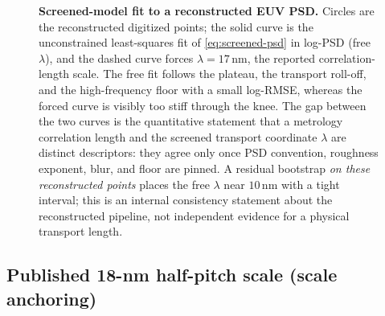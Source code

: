 \documentclass[11pt]{article}
\begin{document}
\begin{figure}[htbp]
\centering
\def\lamfree{10.11}\def\rmsefree{0.111}\def\rmseforced{0.350}
\centering
{}

\caption{\textbf{Screened-model fit to a reconstructed EUV PSD.} Circles are the reconstructed digitized points; the solid curve is the unconstrained least-squares fit of \eqref{eq:screened-psd} in log-PSD (free \(\lambda\)), and the dashed curve forces \(\lambda=17\,\mathrm{nm}\), the reported correlation-length scale. The free fit follows the plateau, the transport roll-off, and the high-frequency floor with a small log-RMSE, whereas the forced curve is visibly too stiff through the knee. The gap between the two curves is the quantitative statement that a metrology correlation length and the screened transport coordinate \(\lambda\) are distinct descriptors: they agree only once PSD convention, roughness exponent, blur, and floor are pinned. A residual bootstrap \emph{on these reconstructed points} places the free \(\lambda\) near \(10\,\mathrm{nm}\) with a tight interval; this is an internal consistency statement about the reconstructed pipeline, not independent evidence for a physical transport length.}
\label{fig:measured-psd-fit}
\end{figure}

\subsection{Published 18-nm half-pitch scale (scale anchoring)}
\end{document}
